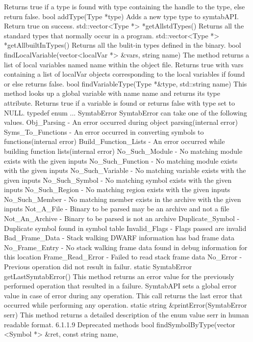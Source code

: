 Returns true if a type is found with type containing the handle to the type, else return false.
bool addType(Type *type)
Adds a new type type to symtabAPI. Return true on success.
std::vector<Type *> *getAllstdTypes()
Returns all the standard types that normally occur in a program.
std::vector<Type *> *getAllbuiltInTypes()
Returns all the bulit-in types defined in the binary.
bool findLocalVariable(vector<localVar *> &vars, string name)
The method returns a list of local variables named name within the object file. 
Returns true with vars containing a list of localVar objects corresponding to the local variables if found or else returns false.
bool findVariableType(Type *&type, std::string name)
This method looks up a global variable with name name and returns its type attribute.
Returns true if a variable is found or returns false with type set to NULL.
typedef enum ... SymtabError
SymtabError can take one of the following values.
Obj_Parsing - An error occurred during object parsing(internal error)
Syms_To_Functions - An error occurred in converting symbols to functions(internal error)
Build_Function_Lists - An error occurred while building function lists(internal error)
No_Such_Module - No matching module exists with the given inputs
No_Such_Function - No matching module exists with the given inputs
No_Such_Variable - No matching variable exists with the given inputs
No_Such_Symbol - No matching symbol exists with the given inputs
No_Such_Region - No matching region exists with the given inputs
No_Such_Member - No matching member exists in the archive with the given inputs
Not_A_File - Binary to be parsed may be an archive and not a file
Not_An_Archive - Binary to be parsed is not an archive
Duplicate_Symbol - Duplicate symbol found in symbol table
Invalid_Flags - Flags passed are invalid
Bad_Frame_Data - Stack walking DWARF information has bad frame data
No_Frame_Entry - No stack walking frame data found in debug information for this location
Frame_Read_Error - Failed to read stack frame data
No_Error - Previous operation did not result in failur.
static SymtabError getLastSymtabError()
This method returns an error value for the previously performed operation that resulted in a failure. 
SymtabAPI sets a global error value in case of error during any operation. This call returns the last error that occurred while performing any operation.
static string &printError(SymtabError serr)
This method returns a detailed description of the enum value serr in human readable format.
6.1.1.9 Deprecated methods
bool findSymbolByType(vector <Symbol *> &ret, const string name,
